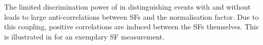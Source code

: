 

The limited discrimination power of \mTW in distinguishing \ttbar events with
and without \faketauhadvis leads to large anti-correlations between
\faketauhadvis SFs and the \ttbar normalisation factor. Due to this coupling,
positive correlations are induced between the SFs themselves. This is
illustrated in  for an exemplary SF measurement.


